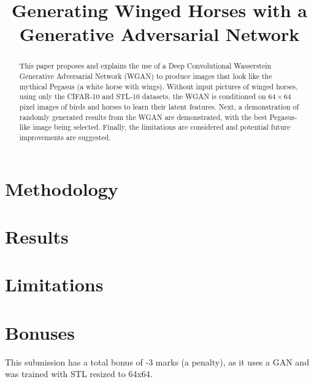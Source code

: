 \documentclass{article}
\title{Generating Winged Horses with a Generative Adversarial Network}
\begin{document}
    \maketitle

    \begin{abstract}
        This paper proposes and explains the use of a Deep Convolutional Wasserstein Generative Adversarial Network (WGAN) to produce images that look like the mythical Pegasus (a white horse with wings).
        Without input pictures of winged horses, using only the CIFAR-10 and STL-10 datasets, the WGAN is conditioned on $64 \times 64$ pixel images of birds and horses to learn their latent features.
        Next, a demonstration of randomly generated results from the WGAN are demonstrated, with the best Pegasus-like image being selected.
        Finally, the limitations are considered and potential future improvements are suggested.
    \end{abstract}


    \section{Methodology}\label{sec:methodology}
    


    \section{Results}\label{sec:results}
    


    \section{Limitations}\label{sec:limitations}
    

    \section*{Bonuses}
    This submission has a total bonus of -3 marks (a penalty), as it uses a GAN and was trained with STL resized to 64x64.

    \printbibliography
\end{document}
